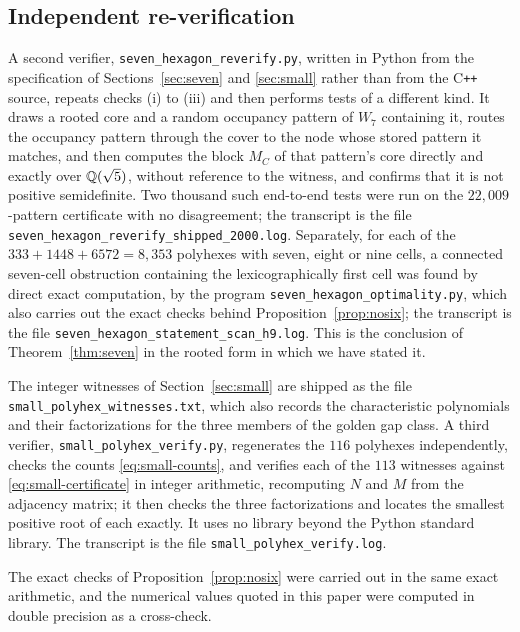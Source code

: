 \documentclass[11pt]{article}
\theoremstyle{definition}
\begin{document}
\subsection*{Independent re-verification}

A second verifier,
\texttt{seven\_\allowbreak hexagon\_\allowbreak reverify.py}, written in Python
from the specification of
Sections~\ref{sec:seven} and \ref{sec:small} rather than from the
C\texttt{++} source, repeats checks (i) to (iii) and then performs tests of a
different kind.  It draws a rooted core and a random occupancy pattern of
$W_7$ containing it, routes the occupancy pattern through the cover to the
node whose stored pattern it matches, and then computes the block $M_C$ of
that pattern's core directly and exactly over ${\mathbb Q}(\sqrt5)$, without
reference to the witness, and confirms that it is not positive semidefinite.
Two thousand such end-to-end tests were run on the $22{,}009$-pattern
certificate with no disagreement; the transcript is the file
\texttt{seven\_hexagon\_reverify\_shipped\_2000.log}.
Separately, for each of the $333+1448+6572=8{,}353$ polyhexes with seven,
eight or nine cells, a connected seven-cell obstruction containing the
lexicographically first cell was found by direct exact computation, by the
program \texttt{seven\_\allowbreak hexagon\_\allowbreak optimality.py},
which also carries out the exact checks behind
Proposition~\ref{prop:nosix}; the transcript is the file
\texttt{seven\_hexagon\_statement\_scan\_h9.log}.  This is
the conclusion of Theorem~\ref{thm:seven} in the rooted form in which we have
stated it.

The integer witnesses of Section~\ref{sec:small} are shipped as the file
\texttt{small\_polyhex\_witnesses.txt}, which also records the
characteristic polynomials and their factorizations for the three members of
the golden gap class.  A third verifier,
\texttt{small\_polyhex\_verify.py}, regenerates the $116$ polyhexes
independently, checks the counts \eqref{eq:small-counts}, and verifies each
of the $113$ witnesses against \eqref{eq:small-certificate} in integer
arithmetic, recomputing $N$ and $M$ from the adjacency matrix; it then checks
the three factorizations and locates the smallest positive root of each
exactly.  It uses no library beyond the Python standard library.  The
transcript is the file \texttt{small\_polyhex\_verify.log}.

The exact checks of Proposition~\ref{prop:nosix} were carried out in the same
exact arithmetic, and the numerical values quoted in this paper were computed
in double precision as a cross-check.
\end{document}
